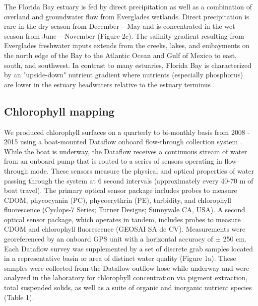 The Florida Bay estuary is fed by direct precipitation as well as  a combination of overland and groundwater flow from Everglades wetlands. Direct precipitation is rare in the dry season from December – May and is concentrated in the wet season from June – November (Figure 2c). The salinity gradient resulting from Everglades freshwater inputs extends from the creeks, lakes, and embayments on the north edge of the Bay to the Atlantic Ocean and Gulf of Mexico to east, south, and southwest. In contrast to many estuaries, Florida Bay is characterized by an "upside-down" nutrient gradient where nutrients (especially phosphorus) are lower in the estuary headwaters relative to the estuary terminus \citep{childers_relating_2006}.

\subsection{Chlorophyll mapping}
\label{chlmapping}

We produced chlorophyll surfaces on a quarterly to bi-monthly basis from 2008 - 2015 using a boat-mounted Dataflow onboard flow-through collection system \citep{madden1992instrument}. While the boat is underway, the Dataflow receives a continuous stream of water from an onboard pump that is routed to a series of sensors operating in flow-through mode. These sensors measure the physical and optical properties of water passing through the system at 6 second intervals (approximately every 40-70 m of boat travel). The primary optical sensor package includes probes to measure CDOM, phycocyanin (PC), phycoerythrin (PE), turbidity, and chlorophyll fluorescence (Cyclops-7 Series; Turner Designs; Sunnyvale CA, USA). A second optical sensor package, which operates in tandem, includes probes to measure CDOM and chlorophyll fluorescence (GEOSAI SA de CV). Measurements were georeferenced by an onboard GPS unit with a horizontal accuracy of ± 250 cm. Each Dataflow survey was supplemented by a set of discrete grab samples located in a representative basin or area of distinct water quality (Figure 1a). These samples were collected from the Dataflow outflow hose while underway and were analyzed in the laboratory for chlorophyll concentration via pigment extraction, total suspended solids, as well as a suite of organic and inorganic nutrient species (Table 1).

